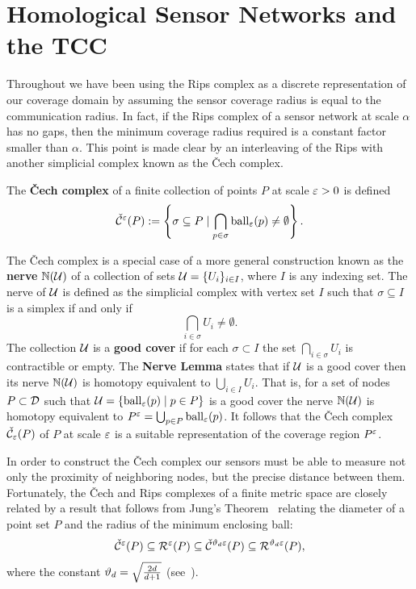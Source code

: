 \section{Homological Sensor Networks and the TCC} %
\label{sec:tcc}

Throughout we have been using the Rips complex as a discrete representation of our coverage domain by assuming the sensor coverage radius is equal to the communication radius.
In fact, if the Rips complex of a sensor network at scale $\alpha$ has no gaps, then the minimum coverage radius required is a constant factor smaller than $\alpha$.
This point is made clear by an interleaving of the Rips with another simplicial complex known as the \v Cech complex.

\begin{definition}
    The \textbf{\v Cech complex} of a finite collection of points $P$ at scale $\varepsilon > 0$ is defined
    \[ \check{\mathcal{C}}^\varepsilon(P) := \left\{\sigma \subseteq P\mid \bigcap_{p\in \sigma}\mathrm{ball}_\varepsilon(p)\neq \emptyset \right\}. \]
\end{definition}
The \v Cech complex is a special case of a more general construction known as the \textbf{nerve} $\mathbb{N}({\mathcal{U}})$ of a collection of sets ${\mathcal{U}} = \{U_i\}_{i\in I}$, where $I$ is any indexing set.
The nerve of ${\mathcal{U}}$ is defined as the simplicial complex with vertex set $I$ such that $\sigma\subseteq I$ is a simplex if and only if
\[
  \bigcap_{i\in \sigma} U_i\neq \emptyset.
\]
The collection ${\mathcal{U}}$ is a \textbf{good cover} if for each $\sigma\subset I$ the set $\bigcap_{i\in\sigma} U_i$ is contractible or empty.
The \textbf{Nerve Lemma} states that if ${\mathcal{U}}$ is a good cover then its nerve $\mathbb{N}({\mathcal{U}})$ is homotopy equivalent to $\bigcup_{i\in I} U_i$.
That is, for a set of nodes $P\subset{\mathcal{D}}$ such that ${\mathcal{U}} = \{\mathrm{ball}_\varepsilon(p)\mid p\in P\}$ is a good cover the nerve $\mathbb{N}({\mathcal{U}})$ is homotopy equivalent to $P^\varepsilon = \bigcup_{p\in P} \mathrm{ball}_\varepsilon(p)$.
It follows that the \v Cech complex $\check{\mathcal{C}}_\varepsilon(P)$ of $P$ at scale $\varepsilon$ is a suitable representation of the coverage region $P^\varepsilon$.

In order to construct the \v Cech complex our sensors must be able to measure not only the proximity of neighboring nodes, but the precise distance between them.
Fortunately, the \v Cech and Rips complexes of a finite metric space are closely related by a result that follows from Jung's Theorem~\cite{jung01uber} relating the diameter of a point set $P$ and the radius of the minimum enclosing ball:
\begin{equation}\label{eq:jung_inclusion}
  \check{\mathcal{C}}^\varepsilon(P)\subseteq\mathcal{R}^\varepsilon(P)\subseteq\check{\mathcal{C}}^{\vartheta_d \varepsilon}(P)\subseteq\mathcal{R}^{\vartheta_d\varepsilon}(P),
\end{equation}
where the constant $\vartheta_d = \sqrt{\frac{2d}{d+1}}$ (see~\cite{buchet15efficient}).

